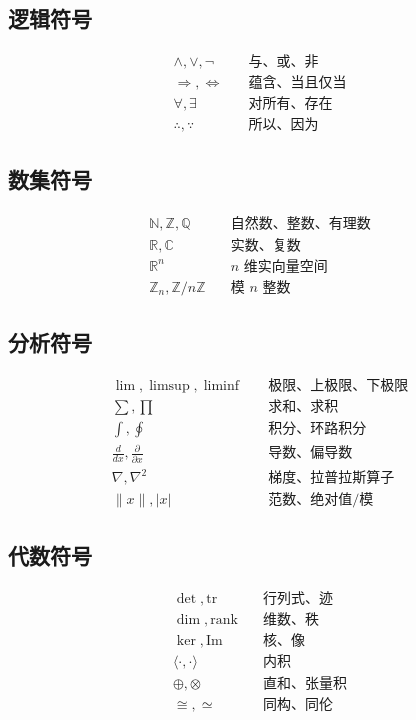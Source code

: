 \documentclass[12pt]{article}
\begin{document}
\subsection{逻辑符号}
\begin{align*}
\land, \lor, \lnot &\quad \text{与、或、非} \\
\Rightarrow, \Leftrightarrow &\quad \text{蕴含、当且仅当} \\
\forall, \exists &\quad \text{对所有、存在} \\
\therefore, \because &\quad \text{所以、因为}
\end{align*}

\subsection{数集符号}
\begin{align*}
\mathbb{N}, \mathbb{Z}, \mathbb{Q} &\quad \text{自然数、整数、有理数} \\
\mathbb{R}, \mathbb{C} &\quad \text{实数、复数} \\
\mathbb{R}^n &\quad \text{$n$ 维实向量空间} \\
\mathbb{Z}_n, \mathbb{Z}/n\mathbb{Z} &\quad \text{模 $n$ 整数}
\end{align*}

\subsection{分析符号}
\begin{align*}
\lim, \limsup, \liminf &\quad \text{极限、上极限、下极限} \\
\sum, \prod &\quad \text{求和、求积} \\
\int, \oint &\quad \text{积分、环路积分} \\
\frac{d}{dx}, \frac{\partial}{\partial x} &\quad \text{导数、偏导数} \\
\nabla, \nabla^2 &\quad \text{梯度、拉普拉斯算子} \\
\|x\|, |x| &\quad \text{范数、绝对值/模}
\end{align*}

\subsection{代数符号}
\begin{align*}
\det, \text{tr} &\quad \text{行列式、迹} \\
\dim, \text{rank} &\quad \text{维数、秩} \\
\ker, \text{Im} &\quad \text{核、像} \\
\langle \cdot, \cdot \rangle &\quad \text{内积} \\
\oplus, \otimes &\quad \text{直和、张量积} \\
\cong, \simeq &\quad \text{同构、同伦}
\end{align*}
\end{document}
